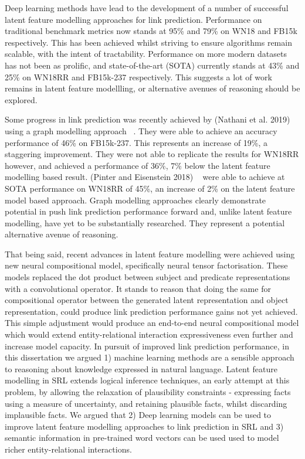 \noindent Deep learning methods have lead to the development of a number of successful latent feature modelling approaches for link prediction. Performance on traditional benchmark metrics now stands at 95\% and 79\% on WN18 and FB15k respectively. This has been achieved whilst striving to ensure algorithms remain scalable, with the intent of tractability. Performance on more modern datasets has not been as prolific, and state-of-the-art (SOTA) currently stands at 43\% and 25\% on WN18RR and FB15k-237 respectively. This suggests a lot of work remains in latent feature modellling, or alternative avenues of reasoning should be explored. \par

\noindent Some progress in link prediction was recently achieved by (Nathani et al. 2019) using a graph modelling approach ~\citep{nathani2019learning}. They were able to achieve an accuracy performance of 46\% on FB15k-237. This represents an increase of 19\%, a staggering improvement. They were not able to replicate the results for WN18RR however, and achieved a performance of 36\%, 7\% below the latent feature modelling based result. (Pinter and Eisenstein 2018) ~\citep{pinter-eisenstein-2018-predicting} were able to achieve at SOTA performance on WN18RR of 45\%, an increase of 2\% on the latent feature model based approach. Graph modelling approaches clearly demonstrate potential in push link prediction performance forward and, unlike latent feature modelling, have yet to be substantially researched. They represent a potential alternative avenue of reasoning. \newpage

\noindent That being said, recent advances in latent feature modelling were achieved using new neural compositional model, specifically neural tensor factorisation. These models replaced the dot product between subject and predicate representations with a convolutional operator. It stands to reason that doing the same for compositional operator between the generated latent representation and object representation, could produce link prediction performance gains not yet achieved. This simple adjustment would produce an end-to-end neural compositional model which would extend entity-relational interaction expressiveness even further and increase model capacity. In pursuit of improved link prediction performance, in this dissertation we argued 1) machine learning methods are a sensible approach to reasoning about knowledge expressed in natural language. Latent feature modelling in SRL extends logical inference techniques, an early attempt at this problem, by allowing the relaxation of plausibility constraints - expressing facts using a measure of uncertainty, and retaining plausible facts, whilst discarding implausible facts. We argued that 2) Deep learning models can be used to improve latent feature modelling approaches to link prediction in SRL and 3) semantic information in pre-trained word vectors can be used used to model richer entity-relational interactions. \par

